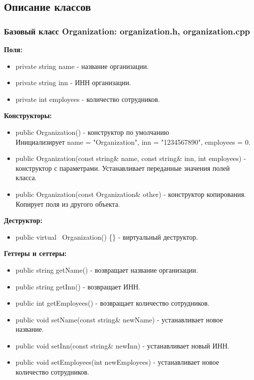 \documentclass[oneside,a4paper,14pt]{extarticle}
\begin{document}
    \subsection*{Описание классов}

    \subsubsection*{Базовый класс Organization: organization.h, organization.cpp}

    \textbf{Поля:}
    \begin{itemize}
        \item private string name - название организации.
        \item private string inn - ИНН организации.
        \item private int employees - количество сотрудников.
    \end{itemize}

    \textbf{Конструкторы:}
    \begin{itemize}
        \item public Organization() - конструктор по умолчанию\\Инициализирует name = "Organization", inn = "1234567890", employees = 0.
        \item public Organization(const string\& name, const string\& inn, int employees) - конструктор с параметрами. Устанавливает переданные значения полей класса.
        \item public Organization(const Organization\& other) - конструктор копирования. Копирует поля из другого объекта.
    \end{itemize}

    \textbf{Деструктор:}
    \begin{itemize}
        \item public virtual ~Organization() \{\} - виртуальный деструктор.
    \end{itemize}

    \newpage

    \textbf{Геттеры и сеттеры:}
    \begin{itemize}
        \item public string getName() - возвращает название организации.
        \item public string getInn() - возвращает ИНН.
        \item public int getEmployees() - возвращает количество сотрудников.
        \item public void setName(const string\& newName) - устанавливает новое название.
        \item public void setInn(const string\& newInn) - устанавливает новый ИНН.
        \item public void setEmployees(int newEmployees) - устанавливает новое количество сотрудников.
    \end{itemize}
\end{document}
